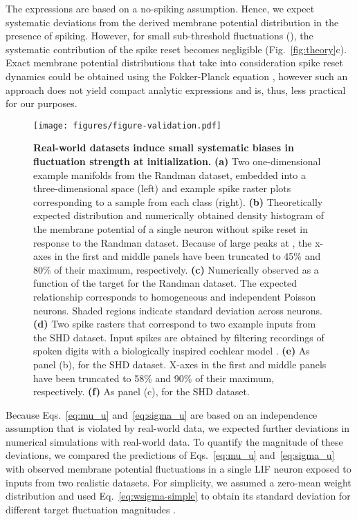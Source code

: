\documentclass[11pt,a4paper]{article}
\begin{document}
The expressions are based on a no-spiking assumption.
Hence, we expect systematic deviations from the derived membrane potential
distribution in
the presence of spiking.
However, for small sub-threshold fluctuations (),
the systematic contribution of the spike reset becomes negligible
(Fig.~\ref{fig:theory}c).
Exact membrane potential distributions that take into consideration
spike reset dynamics could be obtained using the Fokker-Planck equation \cite{Amit1997-ds,Gerstner2014-ke}, however such an approach does not yield compact analytic expressions and is, thus, less practical for our purposes.











\begin{figure}[tbh]
    \texttt{[image: figures/figure-validation.pdf]}
    \caption{\textbf{Real-world datasets induce small systematic biases in
fluctuation strength at initialization.}
\textbf{(a)} Two one-dimensional example manifolds from the Randman dataset,
embedded into a three-dimensional space (left) and example spike raster plots
corresponding to a sample from each class (right).
\textbf{(b)} Theoretically expected distribution and numerically obtained density histogram of the membrane potential of a single neuron without spike reset in response to the Randman dataset. Because of large peaks at , the x-axes in the first and middle panels have been truncated to 45\% and 80\% of their maximum, respectively. 
\textbf{(c)} Numerically observed  as a function of the
target  for the Randman dataset. The expected relationship
corresponds to homogeneous and independent Poisson neurons. Shaded regions
indicate standard deviation across neurons.
\textbf{(d)} Two spike rasters that correspond to two example inputs from the
SHD dataset. Input spikes are obtained by filtering recordings of spoken
digits with a biologically inspired cochlear model \citep{cramer_heidelberg_2020}.
\textbf{(e)} As panel (b), for the SHD dataset. X-axes in the first and middle panels have been truncated to 58\% and 90\% of their maximum, respectively. 
\textbf{(f)} As panel (c), for the SHD dataset.
}
\label{fig:valid}
\end{figure}

Because Eqs.~\eqref{eq:mu_u} and~\eqref{eq:sigma_u} are based on an
independence assumption that is violated by real-world data, we expected
further deviations in numerical simulations with real-world data.
To quantify the magnitude of these deviations, we compared the predictions of
Eqs.~\eqref{eq:mu_u} and~\eqref{eq:sigma_u} with observed membrane potential
fluctuations in a single \ac{LIF} neuron exposed to inputs from two realistic
datasets.
For simplicity, we assumed a zero-mean weight distribution and used
Eq.~\eqref{eq:wsigma-simple} to obtain its standard deviation for different
target fluctuation magnitudes .
\end{document}
